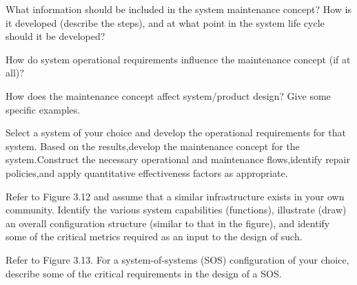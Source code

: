 \begin{exercises}
    \begin{exercise}
    \label{sea-3-7}
        What information should be included in the system maintenance concept? How is it developed (describe the steps), and at what point in the system life cycle should it be developed?
    \end{exercise}
    \begin{solution}
    \end{solution}
    
    \begin{exercise}
    \label{sea-3-8}
        How do system operational requirements influence the maintenance concept (if at all)?
    \end{exercise}
    \begin{solution}
    \end{solution}
    
    \begin{exercise}
    \label{sea-3-9}
        How does the maintenance concept affect system/product design? Give some specific examples.
    \end{exercise}
    \begin{solution}
    \end{solution}
    
    \begin{exercise}
    \label{sea-3-10}
        Select a system of your choice and develop the operational requirements for that system. Based on the results,develop the maintenance concept for the system.Construct the necessary operational and maintenance flows,identify repair policies,and apply quantitative effectiveness factors as appropriate.
    \end{exercise}
    \begin{solution}
    \end{solution}
    
    \begin{exercise}
    \label{sea-3-11}
        Refer to Figure 3.12 and assume that a similar infrastructure exists in your own community. Identify the various system capabilities (functions), illustrate (draw) an overall configuration structure (similar to that in the figure), and identify some of the critical metrics required as an input to the design of such.
    \end{exercise}
    \begin{solution}
    \end{solution}
    
    \begin{exercise}
    \label{sea-3-12}
        Refer to Figure 3.13. For a system-of-systems (SOS) configuration of your choice, describe some of the critical requirements in the design of a SOS. 
    \end{exercise}
    \begin{solution}
    \end{solution}
    

\end{exercises}

